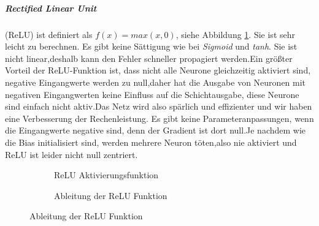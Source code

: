 \documentclass[12pt,a4paper]{scrartcl}
\numberwithin{equation}{section}
\begin{document}
\subparagraph{Rectified Linear Unit} (ReLU) ist definiert als $f(x)= max(x,0) $, siehe Abbildung \ref{fig:relu}. Sie ist sehr leicht zu berechnen. Es gibt keine Sättigung wie bei \textit{Sigmoid} und \textit{tanh}. Sie ist nicht linear,deshalb kann den Fehler schneller propagiert werden.Ein größter Vorteil der ReLU-Funktion ist, dass nicht alle Neurone gleichzeitig aktiviert sind, negative Eingangwerte werden zu null,daher hat die Ausgabe von Neuronen mit negativen Eingangwerten keine Einfluss auf die Schichtausgabe, diese Neurone sind einfach nicht aktiv.Das Netz wird also spärlich und effizienter und wir haben eine Verbesserung der Rechenleistung.
Es gibt keine Parameteranpassungen, wenn die Eingangwerte negative sind, denn der Gradient ist dort null.Je nachdem wie die Bias initialisiert sind, werden mehrere Neuron töten,also nie aktiviert und ReLU ist leider nicht null zentriert. 
\begin{figure}[h]
	\caption{ReLU Aktivierungsfunktion}
	\begin{subfigure}{.5\textwidth}
		\centering
		\caption{ReLU Aktivierungsfunktion}
		
	\end{subfigure}%
	\begin{subfigure}{.5\textwidth}
		\centering
		\caption{Ableitung der ReLU Funktion}
		
	\end{subfigure}
	\label{fig:relu}
\end{figure}
\end{document}
